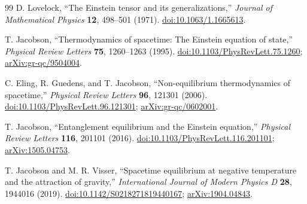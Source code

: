 \documentclass[11pt]{article}
\begin{document}
\begin{thebibliography}{99}
D. Lovelock,
``The Einstein tensor and its generalizations,''
\emph{Journal of Mathematical Physics} \textbf{12}, 498--501 (1971).
\href{https://doi.org/10.1063/1.1665613}{doi:10.1063/1.1665613}.

T. Jacobson,
``Thermodynamics of spacetime: The Einstein equation of state,''
\emph{Physical Review Letters} \textbf{75}, 1260--1263 (1995).
\href{https://doi.org/10.1103/PhysRevLett.75.1260}{doi:10.1103/PhysRevLett.75.1260};
\href{https://arxiv.org/abs/gr-qc/9504004}{arXiv:gr-qc/9504004}.

C. Eling, R. Guedens, and T. Jacobson,
``Non-equilibrium thermodynamics of spacetime,''
\emph{Physical Review Letters} \textbf{96}, 121301 (2006).
\href{https://doi.org/10.1103/PhysRevLett.96.121301}{doi:10.1103/PhysRevLett.96.121301};
\href{https://arxiv.org/abs/gr-qc/0602001}{arXiv:gr-qc/0602001}.

T. Jacobson,
``Entanglement equilibrium and the Einstein equation,''
\emph{Physical Review Letters} \textbf{116}, 201101 (2016).
\href{https://doi.org/10.1103/PhysRevLett.116.201101}{doi:10.1103/PhysRevLett.116.201101};
\href{https://arxiv.org/abs/1505.04753}{arXiv:1505.04753}.

T. Jacobson and M. R. Visser,
``Spacetime equilibrium at negative temperature and the attraction of gravity,''
\emph{International Journal of Modern Physics D} \textbf{28}, 1944016 (2019).
\href{https://doi.org/10.1142/S0218271819440167}{doi:10.1142/S0218271819440167};
\href{https://arxiv.org/abs/1904.04843}{arXiv:1904.04843}.

\end{thebibliography}
\end{document}
